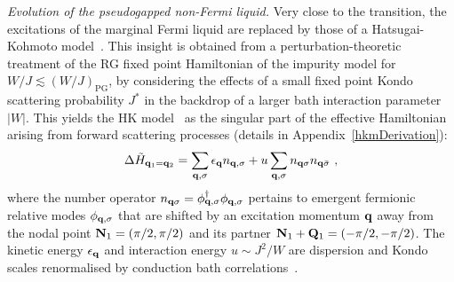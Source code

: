\documentclass[%
 reprint,
superscriptaddress,
groupedaddress,
 amsmath,amssymb,
 aps,
prl,superscriptaddress
]{revtex4-2}
\begin{document}
\par\noindent\textit{Evolution of the pseudogapped non-Fermi liquid.} Very close to the transition, the excitations of the marginal Fermi liquid are replaced by those of a Hatsugai-Kohmoto model~\cite{Baskaran1991,Hatsugai1992}. This insight is obtained from a perturbation-theoretic treatment of the RG fixed point Hamiltonian of the impurity model for $W/J\lesssim (W/J)_{\text{PG}}$, by considering the effects of a small fixed point Kondo scattering probability \(J^*\) in the backdrop of a larger bath interaction parameter \(|W|\). This yields the HK model~\cite{Baskaran1991,Hatsugai1992} as the singular part of the effective Hamiltonian arising from forward scattering processes (details in Appendix~\ref{hkmDerivation}):
\begin{equation}\begin{aligned}\label{HKModel}
	\Delta \tilde H_{{\bf q}_1 = {\bf q}_2} = \sum_{{\bf q},\sigma}\epsilon_{{\bf q}}{n}_{{\bf q},\sigma} + u\sum_{{\bf q}, \sigma}n_{{\bf q} \sigma} n_{{\bf q} \bar\sigma}~,
\end{aligned}\end{equation}
where the number operator \(n_{{\bf q} \sigma} = \phi^\dagger_{{\bf q}, \sigma} \phi_{{\bf q}, \sigma}\) pertains to emergent fermionic relative modes $\phi_{{\bf q}, \sigma}$ that are shifted by an excitation momentum \({\bf q}\) away from the nodal point \({\bf N}_1 = \left(\pi/2, \pi/2\right)\) and its 
partner \({\bf N}_1 + {\bf Q}_1 = \left(-\pi/2, -\pi/2\right)\). The kinetic energy \(\epsilon_{\bf q}\) and interaction energy \(u\sim J^{2}/W\) are dispersion and Kondo scales renormalised by conduction bath correlations~\cite{suppmat}.
\end{document}
